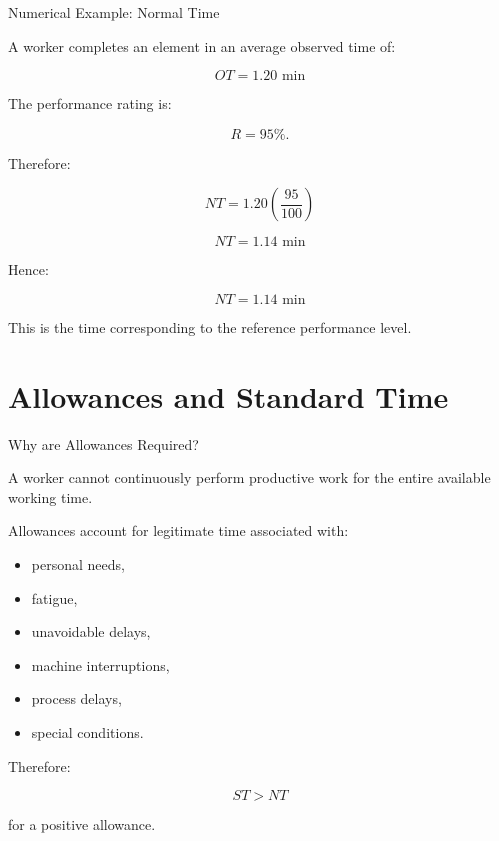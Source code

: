 \documentclass[aspectratio=169,10pt]{beamer}
\begin{document}

\begin{frame}[shrink=18]{Numerical Example: Normal Time}
\small

A worker completes an element in an average observed time of:

\[
OT=1.20\text{ min}
\]

The performance rating is:

\[
R=95\%.
\]

Therefore:

\[
NT
=
1.20
\left(
\frac{95}{100}
\right)
\]

\[
NT=1.14\text{ min}
\]

Hence:

\[
\boxed{
NT=1.14\text{ min}
}
\]

This is the time corresponding to the reference performance level.

\end{frame}


\section{Allowances and Standard Time}

\begin{frame}[shrink=18]{Why are Allowances Required?}
\small

A worker cannot continuously perform productive work for the entire
available working time.

Allowances account for legitimate time associated with:

\begin{itemize}
    \item personal needs,
    \item fatigue,
    \item unavoidable delays,
    \item machine interruptions,
    \item process delays,
    \item special conditions.
\end{itemize}

Therefore:

\[
\boxed{
ST>NT
}
\]

for a positive allowance.

\end{frame}
\end{document}
